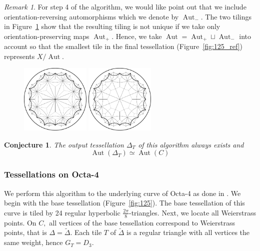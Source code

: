 \documentclass[12pt,reqno]{amsart}
\DeclareMathOperator{\Aut}{Aut}
\newtheorem{conjecture}[theorem]{Conjecture}
\theoremstyle{definition}
\theoremstyle{remark}
\newtheorem*{remark}{Remark}
\begin{document}
\begin{remark}
For step 4 of the algorithm, we would like point out that we include orientation-reversing automorphisms which we denote by $\Aut_-.$ The two tilings in Figure~\ref{fig:125_hyp_i} show that the resulting tiling is not unique if we take only orientation-preserving maps $\Aut_+.$ Hence, we take $\Aut = \Aut_+ \sqcup \Aut_-$ into account so that the smallest tile in the final tessellation (Figure~\ref{fig:125_ref}) represents $X/\Aut.$

\begin{figure}[htbp] %
\centering
\begin{minipage}{.5\textwidth}
	\centering
	\includegraphics[width=1.3in]{figures/125_hyp_1.pdf}
\end{minipage}%
\begin{minipage}{.5\textwidth}
	\centering
	\includegraphics[width=1.3in]{figures/125_hyp_2.pdf}
\end{minipage}
\label{fig:125_hyp_i}
\end{figure}
\end{remark}


\begin{conjecture} \label{tessconj}
The output tessellation $\Delta_T$ of this algorithm always exists and $$\Aut(\Delta_T) \simeq \Aut(C)$$
\end{conjecture}


\subsubsection*{Tessellations on Octa-4}
We perform this algorithm to the underlying curve of Octa-4 as done in \cite{dami}. We begin with the base tessellation (Figure~\ref{fig:125}). The base tessellation of this curve is tiled by 24 regular hyperbolic $\frac{2 \pi}{8}$-triangles. Next, we locate all Weierstrass points. On $C,$ all vertices of the base tessellation correspond to Weierstrass points, that is $\Delta = \widetilde{\Delta}$. Each tile $T$ of $\widetilde{\Delta}$ is a regular triangle with all vertices the same weight, hence $G_T = D_3$. 
\end{document}
